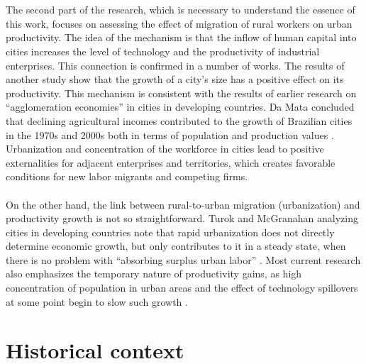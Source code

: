 \documentclass[a4paper, 12pt]{article}
\begin{document}
\\\\
The second part of the research, which is necessary to understand the essence of this work, focuses on assessing the effect of migration of rural workers on urban productivity. The idea of the mechanism is that the inflow of human capital into cities increases the level of technology and the productivity of industrial enterprises. This connection is confirmed in a number of works. The results of another  study  show that the growth of a city's size has a positive effect on its productivity\parencite{shen2019city}. This mechanism is consistent with the results of earlier research on “agglomeration economies” in cities in developing countries. Da Mata concluded that declining agricultural incomes contributed to the growth of Brazilian cities in the 1970s and 2000s both in terms of population and production values \parencite{da2005determinants}. Urbanization and concentration of the workforce in cities lead to positive externalities for adjacent enterprises and territories, which creates favorable conditions for new labor migrants and competing firms.
\\\\
On the other hand, the link between rural-to-urban migration (urbanization) and productivity growth is not so straightforward. Turok and McGranahan analyzing cities in developing countries note that rapid urbanization does not directly determine economic growth, but only contributes to it in a steady state, when there is no problem with “absorbing surplus urban labor” \parencite{turok2013urbanization}. Most current research also emphasizes the temporary nature of productivity gains, as high concentration of population in urban areas and the effect of technology spillovers at some point begin to slow such growth \parencite{bertinelli2004urbanization, lee2015agglomeration } .

    
    
\section{Historical context}



\end{document}
